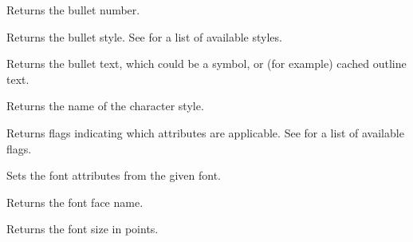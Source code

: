 \label{wxrichtextattrgetbulletnumber}


Returns the bullet number.

\label{wxrichtextattrgetbulletstyle}


Returns the bullet style.
See  for a list of available styles.

\label{wxrichtextattrgetbullettext}


Returns the bullet text, which could be a symbol, or (for example) cached outline text.

\label{wxrichtextattrgetcharacterstylename}


Returns the name of the character style.

\label{wxrichtextattrgetflags}


Returns flags indicating which attributes are applicable.
See  for a list of available flags.

\label{wxrichtextattrgetfontattributes}


Sets the font attributes from the given font.

\label{wxrichtextattrgetfontfacename}


Returns the font face name.

\label{wxrichtextattrgetfontsize}


Returns the font size in points.

\label{wxrichtextattrgetfontstyle}

